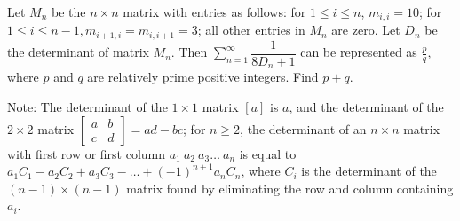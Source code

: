 Let $M_n$ be the $n\times n$ matrix with entries as follows: for $1\leq i \leq n$, $m_{i,i}=10$; for $1\leq i \leq n-1, m_{i+1,i}=m_{i,i+1}=3$; all other entries in $M_n$ are zero. Let $D_n$ be the determinant of matrix $M_n$. Then $\displaystyle \sum_{n=1}^{\infty} \dfrac{1}{8D_n+1}$ can be represented as $\frac{p}{q}$, where $p$ and $q$ are relatively prime positive integers. Find $p+q$.

Note: The determinant of the $1\times 1$ matrix $[a]$ is $a$, and the determinant of the $2\times 2$ matrix $\left[ \begin{array}{cc} a & b \\ c & d \end{array} \right]=ad-bc$; for $n\geq 2$, the determinant of an $n\times n$ matrix with first row or first column $a_1\ a_2\ a_3 \dots\ a_n$ is equal to $a_1C_1 - a_2C_2 + a_3C_3 - \dots + (-1)^{n+1} a_nC_n$, where $C_i$ is the determinant of the $(n-1)\times (n-1)$ matrix found by eliminating the row and column containing $a_i$.